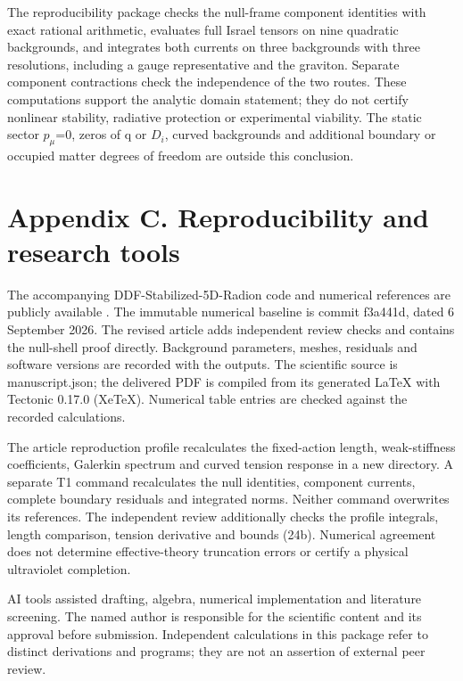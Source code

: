 \documentclass[11pt,a4paper]{article}
\begin{document}
The reproducibility package checks the null-frame component identities with exact rational arithmetic, evaluates full Israel tensors on nine quadratic backgrounds, and integrates both currents on three backgrounds with three resolutions, including a gauge representative and the graviton. Separate component contractions check the independence of the two routes. These computations support the analytic domain statement; they do not certify nonlinear stability, radiative protection or experimental viability. The static sector \ensuremath{p_\mu}=0, zeros of q or \ensuremath{D_i}, curved backgrounds and additional boundary or occupied matter degrees of freedom are outside this conclusion.

\section*{Appendix C. Reproducibility and research tools}
The accompanying DDF-Stabilized-5D-Radion code and numerical references are publicly available \cite{ref24}. The immutable numerical baseline is commit f3a441d, dated 6 September 2026. The revised article adds independent review checks and contains the null-shell proof directly. Background parameters, meshes, residuals and software versions are recorded with the outputs. The scientific source is manuscript.json; the delivered PDF is compiled from its generated LaTeX with Tectonic 0.17.0 (XeTeX). Numerical table entries are checked against the recorded calculations.

The article reproduction profile recalculates the fixed-action length, weak-stiffness coefficients, Galerkin spectrum and curved tension response in a new directory. A separate T1 command recalculates the null identities, component currents, complete boundary residuals and integrated norms. Neither command overwrites its references. The independent review additionally checks the profile integrals, length comparison, tension derivative and bounds (24b). Numerical agreement does not determine effective-theory truncation errors or certify a physical ultraviolet completion.

AI tools assisted drafting, algebra, numerical implementation and literature screening. The named author is responsible for the scientific content and its approval before submission. Independent calculations in this package refer to distinct derivations and programs; they are not an assertion of external peer review.
\end{document}
